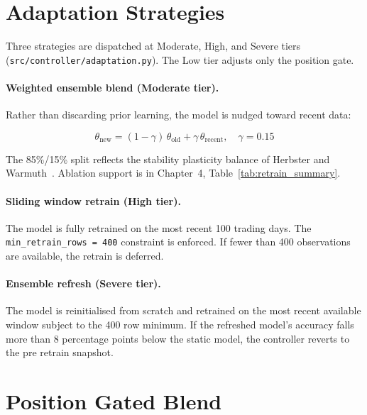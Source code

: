 \section{Adaptation Strategies}
\label{sec:adaptation}

Three strategies are dispatched at Moderate, High, and Severe tiers (\texttt{src/controller/adaptation.py}). The Low tier adjusts only the position gate.

\paragraph{Weighted ensemble blend (Moderate tier).}
Rather than discarding prior learning, the model is nudged toward recent data:

\begin{equation}
  \theta_{\text{new}} = (1 - \gamma)\,\theta_{\text{old}} + \gamma\,\theta_{\text{recent}},
  \quad \gamma = 0.15
  \label{eq:sgd_blend}
\end{equation}

The 85\%/15\% split reflects the stability plasticity balance of Herbster and Warmuth~\cite{herbster1998}. Ablation support is in Chapter~4, Table~\ref{tab:retrain_summary}.

\paragraph{Sliding window retrain (High tier).}
The model is fully retrained on the most recent 100 trading days. The \texttt{min\_retrain\_rows = 400} constraint is enforced. If fewer than 400 observations are available, the retrain is deferred.

\paragraph{Ensemble refresh (Severe tier).}
The model is reinitialised from scratch and retrained on the most recent available window subject to the 400 row minimum. If the refreshed model's accuracy falls more than 8 percentage points below the static model, the controller reverts to the pre retrain snapshot.

\section{Position Gated Blend}
\label{sec:position_gate}

